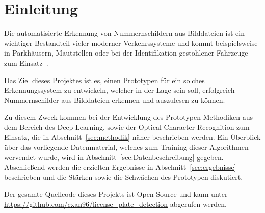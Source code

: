 \section{Einleitung}

Die automatisierte Erkennung von Nummernschildern aus Bilddateien
ist ein wichtiger Bestandteil vieler moderner Verkehrssysteme
und kommt beispielsweise in Parkh\"ausern, Mautstellen
oder bei der Identifikation gestohlener Fahrzeuge zum
Einsatz~\cite{silva2018a}.

Das Ziel dieses Projektes ist es, einen Prototypen f\"ur ein solches
Erkennungssystem zu entwickeln, welcher in der
Lage sein soll, erfolgreich Nummernschilder aus Bilddateien erkennen
und auszulesen zu k\"onnen.

Zu diesem Zweck kommen bei der Entwicklung des Prototypen Methodiken aus dem
Bereich des Deep Learning, sowie der Optical Character Recognition
zum Einsatz, die in Abschnitt~\ref{sec:methodik} n\"aher beschrieben
werden.
Ein \"Uberblick \"uber das vorliegende Datenmaterial, welches
zum Training dieser Algorithmen wervendet wurde, wird in
Abschnitt~\ref{sec:Datenbeschreibung} gegeben.
Abschlie{\ss}end werden die erzielten Ergebnisse in
Abschnitt~\ref{sec:ergebnisse} beschrieben und die St\"arken
sowie die Schw\"achen des Prototypen diskutiert.

Der gesamte Quellcode dieses Projekts ist Open Source und kann
unter \url{https://github.com/cxan96/license_plate_detection}
abgerufen werden.

